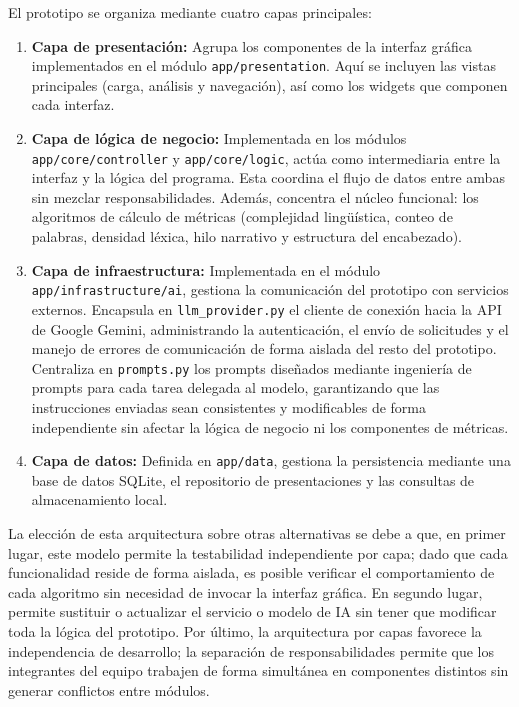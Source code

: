 \documentclass[11pt]{article}
\begin{document}
El prototipo se organiza mediante cuatro capas principales:
\begingroup
\small
\RaggedRight
\begin{enumerate}
    \item \textbf{Capa de presentación:} Agrupa los componentes de la interfaz gráfica implementados en el módulo \texttt{app/presentation}. Aquí se incluyen las vistas principales (carga, análisis y navegación), así como los widgets que componen cada interfaz.
    \item \textbf{Capa de lógica de negocio:} Implementada en los módulos \texttt{app/core/controller} y \texttt{app/core/logic}, actúa como intermediaria entre la interfaz y la lógica del programa. Esta coordina el flujo de datos entre ambas sin mezclar responsabilidades. Además, concentra el núcleo funcional: los algoritmos de cálculo de métricas (complejidad lingüística, conteo de palabras, densidad léxica, hilo narrativo y estructura del encabezado).
    \item \textbf{Capa de infraestructura:} Implementada en el módulo \texttt{app/infrastructure/ai}, gestiona la comunicación del prototipo con servicios externos. Encapsula en \texttt{llm\_provider.py} el cliente de conexión hacia la API de Google Gemini, administrando la autenticación, el envío de solicitudes y el manejo de errores de comunicación de forma aislada del resto del prototipo. Centraliza en \texttt{prompts.py} los prompts diseñados mediante ingeniería de prompts para cada tarea delegada al modelo, garantizando que las instrucciones enviadas sean consistentes y modificables de forma independiente sin afectar la lógica de negocio ni los componentes de métricas.
    \item \textbf{Capa de datos:} Definida en \texttt{app/data}, gestiona la persistencia mediante una base de datos SQLite, el repositorio de presentaciones y las consultas de almacenamiento local.
\end{enumerate}
\endgroup

La elección de esta arquitectura sobre otras alternativas se debe a que, en primer lugar, este modelo permite la testabilidad independiente por capa; dado que cada funcionalidad reside de forma aislada, es posible verificar el comportamiento de cada algoritmo sin necesidad de invocar la interfaz gráfica. En segundo lugar, permite sustituir o actualizar el servicio o modelo de IA sin tener que modificar toda la lógica del prototipo. Por último, la arquitectura por capas favorece la independencia de desarrollo; la separación de responsabilidades permite que los integrantes del equipo trabajen de forma simultánea en componentes distintos sin generar conflictos entre módulos.
\end{document}
